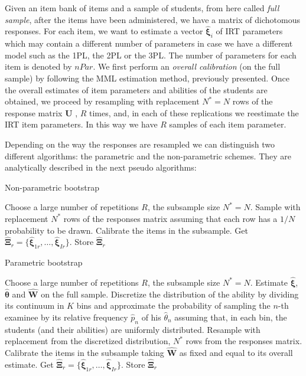 Given an item bank of items and a sample of students, from here called \emph{full sample}, after the items have been administered, we have a matrix of dichotomous responses. For each item, we want to estimate a vector $\boldsymbol{\hat{\xi}}_i$ of IRT parameters which may contain a different number of parameters in case we have a different model such as the 1PL, the 2PL or the 3PL. The  number of parameters for each item is denoted by $nPar$.
We first perform an \emph{overall calibration} (on the full sample) by following the MML estimation method, previously presented. Once the overall estimates of item parameters and abilities of the students are obtained, we proceed by resampling with replacement $N^* = N$ rows of the response matrix $\mathbf{U}$ , $R$ times, and, in each of these replications we reestimate the IRT item parameters. In this way we have $R$ samples of each item parameter. 

Depending on the way the responses are resampled we can distinguish two different algorithms: the parametric and the non-parametric schemes. They are analytically described in the next pseudo algorithms:

\begin{algorithm}[H]
	\caption{Non-parametric bootstrap}
	\begin{algorithmic}
		\State Choose a large number of repetitions $R$, the subsample size $N^* = N$.
		\State Sample with replacement $N^*$ rows of the responses matrix assuming that each row has a $1/N$ probability to be drawn. 
		\State Calibrate the items in the subsample. Get $\hat{\boldsymbol{\Xi}}_{r}=\{\hat{\boldsymbol{\xi}}_{1r},\ldots,\hat{\boldsymbol{\xi}}_{Ir}\}$.
		\State Store $\hat{\boldsymbol{\Xi}}_{r}$
		\EndFor
	\end{algorithmic}
\end{algorithm}

\begin{algorithm}[H]
	\caption{Parametric bootstrap}
	\begin{algorithmic}
		\State Choose a large number of repetitions $R$, the subsample size $N^* = N$.
		\State Estimate $\boldsymbol{\hat{\xi}}$, $\hat{\boldsymbol{\theta}}$ and $\mathbf{\hat{W}}$ on the full sample.
		\State Discretize the distribution of the ability by dividing its continuum in $K$ bins and approximate the probability of sampling the $n$-th examinee by its relative frequency $\hat{p}_n$ of his $\hat{\theta}_n$ assuming that, in each bin, the students (and their abilities) are uniformly distributed.
		\For{$r=1:R$}
		\State Resample with replacement from the discretized distribution, $N^*$ rows from the responses matrix.  
		\State Calibrate the items in the subsample taking $\mathbf{\hat{W}}$ as fixed and equal to its overall estimate. Get $\hat{\boldsymbol{\Xi}}_{r}=\{\hat{\boldsymbol{\xi}}_{1r},\ldots,\hat{\boldsymbol{\xi}}_{Ir}\}$.
		\State Store $\hat{\boldsymbol{\Xi}}_{r}$
		
		\EndFor
	\end{algorithmic}
\end{algorithm}

